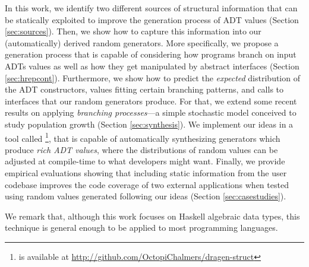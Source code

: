 In this work, we identify two different sources of structural information that
can be statically exploited to improve the generation process of ADT values
(Section \ref{sec:sources}).
%
%
Then, we show how to capture this information into our (automatically) derived
random generators.
%
More specifically, we propose a generation process that is capable of
considering how programs branch on input ADTs values as well as how they get
manipulated by abstract interfaces (Section \ref{sec:hrepcont}).
%
Furthermore, we show how to predict the \emph{expected} distribution of the ADT
constructors, values fitting certain branching patterns, and calls to interfaces
that our random generators produce.
%
For that, we extend some recent results on applying \emph{branching
  processes}\cite{gw1875}---a simple stochastic model conceived to study
population growth (Section \ref{sec:synthesis}).
%
%
We implement our ideas in a tool called \dragenp\footnote{\dragenp is available
  at \url{http://github.com/OctopiChalmers/dragen-struct}}, that is capable of
automatically synthesizing \quickcheck generators which produce \emph{rich ADT
  values}, where the distributions of random values can be adjusted at
compile-time to what developers might want. %
%
Finally, we provide empirical evaluations showing that including static
information from the user codebase improves the code coverage of two external
applications when tested using random values generated following our ideas
(Section \ref{sec:casestudies}).


We remark that, although this work focuses on Haskell algebraic data types, this
technique is general enough to be applied to most programming languages.
%

